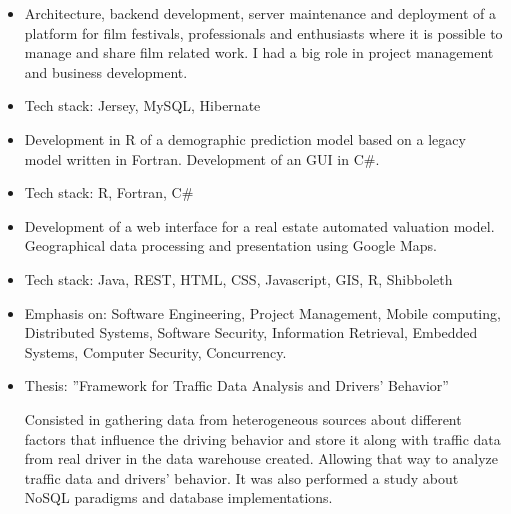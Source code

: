 \documentclass[10pt,a4paper]{altacv}
\begin{document}
\divider

\begin{itemize}
\justifying
\item Architecture, backend development, server maintenance and deployment of a
  platform for film festivals, professionals and enthusiasts where it is
  possible to manage and share film related work. I had a big role in project
  management and business development.
\item Tech stack: Jersey, MySQL, Hibernate
\end{itemize}

\divider

\begin{itemize}
\justifying
\item Development in R of a demographic prediction model based on a legacy model 
written in Fortran. Development of an GUI in C#.
\item Tech stack: R, Fortran, C#
\end{itemize}

\newpage 

\begin{itemize}
\justifying
\item Development of a web interface for a real estate automated valuation model.
Geographical data processing and presentation using Google Maps.
\item Tech stack: Java, REST, HTML, CSS, Javascript, GIS, R, Shibboleth
\end{itemize}

 
\begin{itemize}
\justifying
\item Emphasis on: Software Engineering, Project Management, Mobile computing, Distributed Systems, Software Security, Information Retrieval, Embedded Systems, Computer Security, Concurrency.
\item Thesis: ''Framework for Traffic Data Analysis and Drivers’ Behavior''
  
Consisted in gathering data from heterogeneous sources about different factors
that influence the driving behavior and store it along with traffic data from real
driver in the data warehouse created. Allowing that way to analyze traffic data
and drivers’ behavior. It was also performed a study about NoSQL paradigms and
database implementations.
\end{itemize}
\divider
\end{document}
